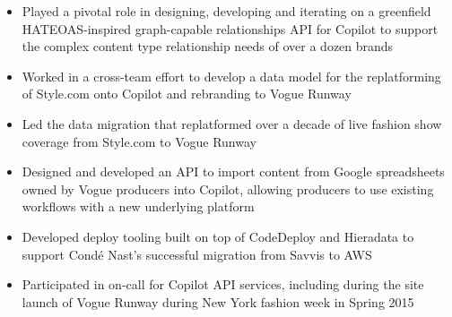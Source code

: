 \begin{itemize}
  \item Played a pivotal role in designing, developing and iterating on a
    greenfield HATEOAS-inspired graph-capable relationships API for Copilot to
    support the complex content type relationship needs of over a dozen brands
  \item Worked in a cross-team effort to develop a data model for the
    replatforming of Style.com onto Copilot and rebranding to Vogue Runway
  \item Led the data migration that replatformed over a decade of live fashion
  show coverage from Style.com to Vogue Runway
  \item Designed and developed an API to import content from Google spreadsheets
    owned by Vogue producers into Copilot, allowing producers to use existing
    workflows with a new underlying platform
  \item Developed deploy tooling built on top of CodeDeploy and Hieradata to
    support Cond\'{e} Nast's successful migration from Savvis to AWS
  \item Participated in on-call for Copilot API services, including during the
    site launch of Vogue Runway during New York fashion week in Spring 2015
\end{itemize}
